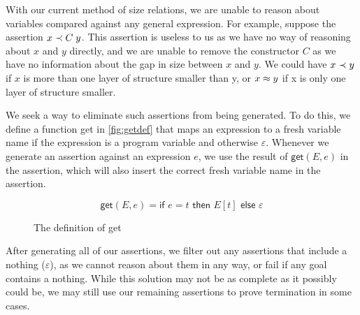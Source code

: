 With our current method of size relations, we are unable to reason about variables
compared against any general expression. For example, suppose the assertion $x \prec C\; y$.
This assertion is useless to us as we have no way of reasoning about $x$ and $y$ directly,
and we are unable to remove the constructor $C$ as we have no information about the
gap in size between $x$ and $y$. We could have $x \prec y$ if $x$ is more than one layer
of structure smaller than y, or $x \approx y$ if x is only one layer of structure smaller.

We seek a way to eliminate such assertions from being generated. To do this,
we define a function \textsf{get} in \autoref{fig:getdef} that maps an expression to
a fresh variable name if the expression is a program variable and otherwise $\varepsilon$.
Whenever we generate an assertion against an expression $e$, we use the result
of $\textsf{get}(E,e)$ in the assertion, which will also insert the correct fresh
variable name in the assertion.

\begin{figure}
    \centering
    \[
        \textsf{get}(E, e) = \textsf{if } e = t \textsf{ then } E[t] \textsf{ else } \varepsilon
    \]
    
    \caption{The definition of \textsf{get}}
    \label{fig:getdef}
\end{figure}

After generating all of our assertions, we filter out any assertions that include a nothing ($\varepsilon$),
as we cannot reason about them in any way, or fail if any goal contains a nothing. While this solution may
not be as complete as it possibly could be, we may still use our remaining assertions
to prove termination in some cases.

